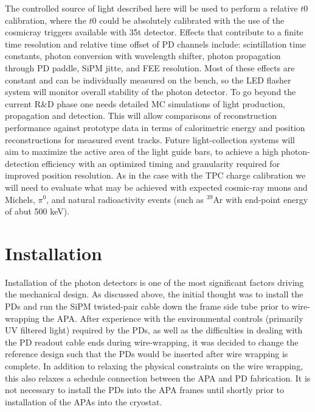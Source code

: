 The controlled source of light described here will be used to perform
a relative $t0$ calibration, where the $t0$ could be absolutely
calibrated with the use of the cosmicray triggers available with
35t detector. Effects that contribute to a finite time resolution
and relative time offset of PD channels include: scintillation time
constants, photon conversion with wavelength shifter, photon
propagation through PD paddle, SiPM jitte, and FEE resolution. Most of
these effects are constant and can be individually measured on the
bench, so the LED flasher system will monitor overall stability of the
photon detector.  To go beyond the current R\&D phase one needs
detailed MC simulations of light production, propagation and
detection. This will allow comparisons of reconstruction performance against
prototype data in terms of calorimetric energy and position
reconstructions for measured event tracks. Future light-collection
systems will aim to maximize the active area of the light guide bars,
to achieve a high photon-detection efficiency with an optimized timing
and granularity required for improved position resolution. As in the
case with the TPC charge calibration we will need to evaluate what may
be achieved with expected cosmic-ray muons and Michels, $\pi^0$, and
natural radioactivity events (such as $^{39}$Ar with end-point energy
of abut 500 keV).

\section{Installation}

Installation of the photon detectors is one of the most significant
factors driving the mechanical design.  As discussed above, the
initial thought was to install the PDs and run the SiPM twisted-pair
cable down the frame side tube prior to wire-wrapping the APA.
After experience with the environmental controls (primarily UV
filtered light) required by the PDs, as well as the difficulties in
dealing with the PD readout cable ends during wire-wrapping, it was
decided to change the reference design  
such that the PDs would be inserted after
wire wrapping is complete.  In addition to relaxing the physical constraints on
the wire wrapping, this also relaxes a schedule connection between the
APA and PD fabrication.  It is not necessary to install the PDs into
the APA frames until shortly prior to installation of the APAs into
the cryostat.

